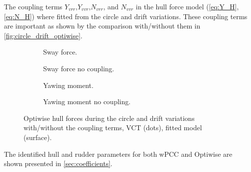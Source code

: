 The coupling terms $Y_{vrr}$,$Y_{vvr}$,$N_{vrr}$, and $N_{vvr}$ in the hull force model (\autoref{eq:Y_H}, \autoref{eq:N_H}) where fitted from the circle and drift variations. These coupling terms are important as shown by the comparison with/without them in \autoref{fig:circle_drift_optiwise}.
\begin{figure}[h]
     \centering
     \begin{subfigure}[b]{0.49\textwidth}
         \centering
         
        \caption{Sway force.}
        \label{fig:circle_drift_Y_H_optiwise}
     \end{subfigure}
     \hfill
     \begin{subfigure}[b]{0.49\textwidth}
         \centering
         
        \caption{Sway force no coupling.}
        \label{fig:circle_drift_Y_H_no_coupling_optiwise}
     \end{subfigure}

     \vfill
     \begin{subfigure}[b]{0.49\textwidth}
         \centering
         
        \caption{Yawing moment.}
        \label{fig:circle_drift_N_H_optiwise}
     \end{subfigure}
     \hfill
     \begin{subfigure}[b]{0.49\textwidth}
         \centering
         
        \caption{Yawing moment no coupling.}
        \label{fig:circle_drift_N_H_no_coupling_optiwise}
     \end{subfigure}
     
    \caption{Optiwise hull forces during the circle and drift variations with/without the coupling terms, VCT (dots), fitted model (surface).}
    \label{fig:circle_drift_optiwise}
\end{figure}

The identified hull and rudder parameters for both wPCC and Optiwise are shown presented in \autoref{sec:coefficients}.